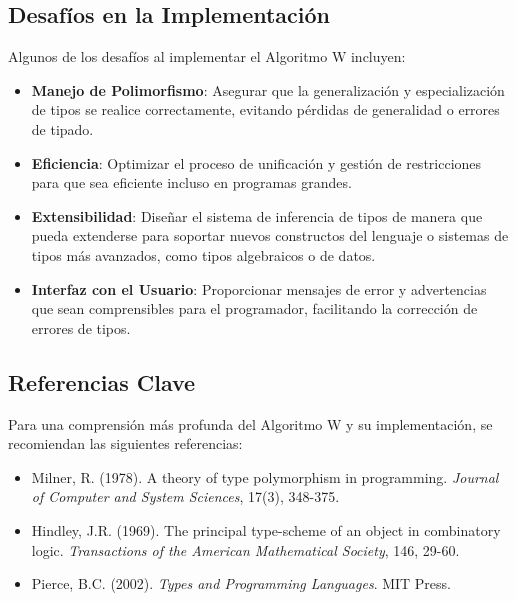 \documentclass{article}
\begin{document}
  \subsection{Desafíos en la Implementación}

  Algunos de los desafíos al implementar el Algoritmo W incluyen:

  \begin{itemize}
    \item \textbf{Manejo de Polimorfismo}: Asegurar que la generalización y especialización de tipos se realice correctamente, evitando pérdidas de generalidad o errores de tipado.

    \item \textbf{Eficiencia}: Optimizar el proceso de unificación y gestión de restricciones para que sea eficiente incluso en programas grandes.

    \item \textbf{Extensibilidad}: Diseñar el sistema de inferencia de tipos de manera que pueda extenderse para soportar nuevos constructos del lenguaje o sistemas de tipos más avanzados, como tipos algebraicos o de datos.

    \item \textbf{Interfaz con el Usuario}: Proporcionar mensajes de error y advertencias que sean comprensibles para el programador, facilitando la corrección de errores de tipos.
  \end{itemize}

  \subsection{Referencias Clave}

  Para una comprensión más profunda del Algoritmo W y su implementación, se recomiendan las siguientes referencias:

  \begin{itemize}
    \item Milner, R. (1978). A theory of type polymorphism in programming. \textit{Journal of Computer and System Sciences}, 17(3), 348-375.

    \item Hindley, J.R. (1969). The principal type-scheme of an object in combinatory logic. \textit{Transactions of the American Mathematical Society}, 146, 29-60.

    \item Pierce, B.C. (2002). \textit{Types and Programming Languages}. MIT Press.
  \end{itemize}
\end{document}
